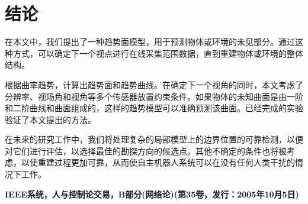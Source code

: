 \documentclass[AutoFakeBold,zihao=-4]{ctexart}
\begin{document}
	\section{结论}
	在本文中，我们提出了一种趋势面模型，用于预测物体或环境的未见部分。通过这种方式，可以确定下一个视点进行在线采集范围数据，直到重建物体或环境的整体结构。
	
	根据曲率趋势，计算出趋势面和趋势曲线。在确定下一个视角的同时，本文考虑了分辨率、视场角和视角等多个传感器放置约束条件。如果物体的未知曲面是由一阶和二阶曲线和曲面组成的，这样的趋势模型可以准确预测该曲面。已经完成的实验验证了本文提出的方法。
	
	在未来的研究工作中，我们将处理复杂的局部模型上的边界位置的可靠检测，以便对它们进行评估，以选择最佳的勘探方向的候选点。其他不确定的条件也将被考虑，以使重建过程更加可靠，从而使自主机器人系统可以在没有任何人类干扰的情况下工作。
	
	\nocite{*}
	
	
	\begin{flushright}
		\songti {} \bfseries IEEE系统，人与控制论交易，B部分(网络论)(第35卷，发行：2005年10月5日)
	\end{flushright}
\end{document}
